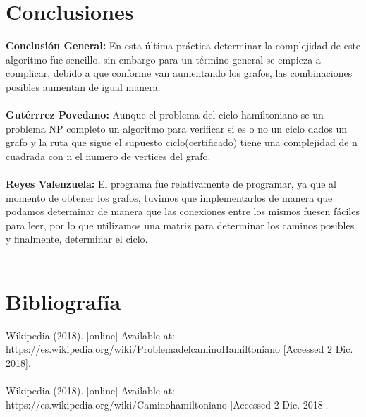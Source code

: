 \documentclass[12pt,twoside]{article}
\begin{document}
\section{Conclusiones}
{\bf Conclusi\'on General:} En esta última práctica determinar la complejidad de este algoritmo fue sencillo, sin embargo para un término general se empieza a complicar, debido a que conforme van aumentando los grafos, las combinaciones posibles aumentan de igual manera.\\\\
{\bf Gutérrrez Povedano:} Aunque el problema del ciclo hamiltoniano se un problema NP completo un algoritmo para verificar si es o no un ciclo dados un grafo y la ruta que sigue el supuesto ciclo(certificado) tiene una complejidad  de n cuadrada con n el numero de vertices del grafo.\\\\
{\bf Reyes Valenzuela:} El programa fue relativamente de programar, ya que al momento de obtener los grafos, tuvimos que implementarlos de manera que podamos determinar de manera que las conexiones entre los mismos fuesen fáciles para leer, por lo que utilizamos una matriz para determinar los caminos posibles y finalmente, determinar el ciclo.\\\\
\section{Bibliograf\'ia}
Wikipedia (2018). [online] Available at: https://es.wikipedia.org/wiki/ProblemadelcaminoHamiltoniano [Accessed 2 Dic. 2018].\\\\
Wikipedia (2018). [online] Available at: https://es.wikipedia.org/wiki/Caminohamiltoniano [Accessed 2 Dic. 2018].\\\\
\end{document}
